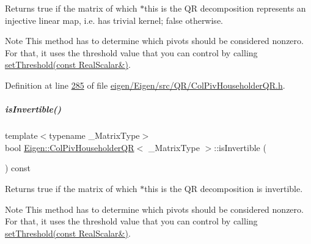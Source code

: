 \begin{DoxyReturn}{Returns}
true if the matrix of which $\ast$this is the QR decomposition represents an injective linear map, i.\+e. has trivial kernel; false otherwise.
\end{DoxyReturn}
\begin{DoxyNote}{Note}
This method has to determine which pivots should be considered nonzero. For that, it uses the threshold value that you can control by calling \hyperlink{group___q_r___module_ae712cdc9f0e521cfc8061bee58ff55ee}{set\+Threshold(const Real\+Scalar\&)}. 
\end{DoxyNote}


Definition at line \hyperlink{eigen_2_eigen_2src_2_q_r_2_col_piv_householder_q_r_8h_source_l00285}{285} of file \hyperlink{eigen_2_eigen_2src_2_q_r_2_col_piv_householder_q_r_8h_source}{eigen/\+Eigen/src/\+Q\+R/\+Col\+Piv\+Householder\+Q\+R.\+h}.

\mbox{\label{group___q_r___module_a945720f8d683f8ebe97fa807edd3142a}} 
\subparagraph{\texorpdfstring{is\+Invertible()}{isInvertible()}\hspace{0.1cm}{\footnotesize\ttfamily [1/2]}}
{\footnotesize\ttfamily template$<$typename \+\_\+\+Matrix\+Type$>$ \\
bool \hyperlink{group___q_r___module_class_eigen_1_1_col_piv_householder_q_r}{Eigen\+::\+Col\+Piv\+Householder\+QR}$<$ \+\_\+\+Matrix\+Type $>$\+::is\+Invertible (\begin{DoxyParamCaption}{ }\end{DoxyParamCaption}) const\hspace{0.3cm}{\ttfamily [inline]}}

\begin{DoxyReturn}{Returns}
true if the matrix of which $\ast$this is the QR decomposition is invertible.
\end{DoxyReturn}
\begin{DoxyNote}{Note}
This method has to determine which pivots should be considered nonzero. For that, it uses the threshold value that you can control by calling \hyperlink{group___q_r___module_ae712cdc9f0e521cfc8061bee58ff55ee}{set\+Threshold(const Real\+Scalar\&)}. 
\end{DoxyNote}


